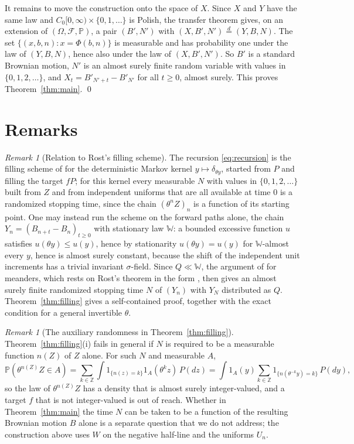\documentclass[11pt]{amsart}
\theoremstyle{remark}
\newtheorem{remark}[theorem]{Remark}
\numberwithin{equation}{section}
\newcommand{\Pp}{\mathbb P}
\newcommand{\Z}{\mathbb Z}
\newcommand{\Wi}{\mathbb W}
\begin{document}
It remains to move the construction onto the space of $X$. Since $X$ and $Y$ have the same law and $C_0[0,\infty)\times\{0,1,\dots\}$ is Polish, the transfer theorem \cite[Theorem~6.10]{Ka} gives, on an extension of $(\Omega,\mathcal F,\Pp)$, a pair $(B',N')$ with $(X,B',N')\overset{d}{=}(Y,B,N)$. The set $\{(x,b,n):x=\Phi(b,n)\}$ is measurable and has probability one under the law of $(Y,B,N)$, hence also under the law of $(X,B',N')$. So $B'$ is a standard Brownian motion, $N'$ is an almost surely finite random variable with values in $\{0,1,2,\dots\}$, and $X_t=B'_{N'+t}-B'_{N'}$ for all $t\ge0$, almost surely. This proves Theorem~\ref{thm:main}. \qed

\section{Remarks}\label{sec:remarks}

\begin{remark}[Relation to Rost's filling scheme]\label{rem:rost}
The recursion \eqref{eq:recursion} is the filling scheme of \cite{CO,Rost71a} for the deterministic Markov kernel $y\mapsto\delta_{\theta y}$, started from $P$ and filling the target $fP$; for this kernel every measurable $N$ with values in $\{0,1,2,\dots\}$ built from $Z$ and from independent uniforms that are all available at time $0$ is a randomized stopping time, since the chain $(\theta^nZ)_n$ is a function of its starting point. One may instead run the scheme on the forward paths alone, the chain $Y_n=(B_{n+t}-B_n)_{t\ge0}$ with stationary law $\Wi$: a bounded excessive function $u$ satisfies $u(\theta y)\le u(y)$, hence by stationarity $u(\theta y)=u(y)$ for $\Wi$-almost every $y$, hence is almost surely constant, because the shift of the independent unit increments has a trivial invariant $\sigma$-field. Since $Q\ll\Wi$, the argument of \cite[Section~3.5]{PT-patterns} for meanders, which rests on Rost's theorem in the form \cite[Chapter~IX, no.~69]{DM}, then gives an almost surely finite randomized stopping time $N$ of $(Y_n)$ with $Y_N$ distributed as $Q$. Theorem~\ref{thm:filling} gives a self-contained proof, together with the exact condition for a general invertible $\theta$.
\end{remark}

\begin{remark}[The auxiliary randomness in Theorem~\ref{thm:filling}]\label{rem:integer}
Theorem~\ref{thm:filling}(i) fails in general if $N$ is required to be a measurable function $n(Z)$ of $Z$ alone. For such $N$ and measurable $A$,
\[
\Pp(\theta^{n(Z)}Z\in A)=\sum_{k\in\Z}\int1_{\{n(z)=k\}}1_A(\theta^kz)\,P(dz)=\int1_A(y)\sum_{k\in\Z}1_{\{n(\theta^{-k}y)=k\}}\,P(dy),
\]
so the law of $\theta^{n(Z)}Z$ has a density that is almost surely integer-valued, and a target $f$ that is not integer-valued is out of reach. Whether in Theorem~\ref{thm:main} the time $N$ can be taken to be a function of the resulting Brownian motion $B$ alone is a separate question that we do not address; the construction above uses $W$ on the negative half-line and the uniforms $U_n$.
\end{remark}
\end{document}
